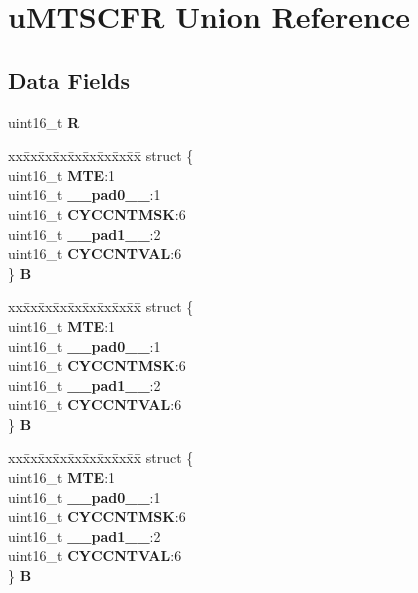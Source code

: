 \hypertarget{unionuMTSCFR}{}\section{u\+M\+T\+S\+C\+FR Union Reference}
\label{unionuMTSCFR}
\subsection*{Data Fields}
\begin{DoxyCompactItemize}
\item 
\mbox{\label{unionuMTSCFR_a91bd2a95fbd0caadf6da5d67d6e1c7c2}} 
uint16\+\_\+t {\bfseries R}
\item 
\mbox{\label{unionuMTSCFR_a1bd8fc26c8d23e866842e9b0d75cba0e}} 
\begin{tabbing}
xx\=xx\=xx\=xx\=xx\=xx\=xx\=xx\=xx\=\kill
struct \{\\
\>uint16\_t {\bfseries MTE}:1\\
\>uint16\_t {\bfseries \_\_pad0\_\_}:1\\
\>uint16\_t {\bfseries CYCCNTMSK}:6\\
\>uint16\_t {\bfseries \_\_pad1\_\_}:2\\
\>uint16\_t {\bfseries CYCCNTVAL}:6\\
\} {\bfseries B}\\

\end{tabbing}\item 
\mbox{\label{unionuMTSCFR_a9b4f2793509a2f5b5ab63f3c9ab1b5a8}} 
\begin{tabbing}
xx\=xx\=xx\=xx\=xx\=xx\=xx\=xx\=xx\=\kill
struct \{\\
\>uint16\_t {\bfseries MTE}:1\\
\>uint16\_t {\bfseries \_\_pad0\_\_}:1\\
\>uint16\_t {\bfseries CYCCNTMSK}:6\\
\>uint16\_t {\bfseries \_\_pad1\_\_}:2\\
\>uint16\_t {\bfseries CYCCNTVAL}:6\\
\} {\bfseries B}\\

\end{tabbing}\item 
\mbox{\label{unionuMTSCFR_ae1cb25b73f8f8137eda808370af22e5d}} 
\begin{tabbing}
xx\=xx\=xx\=xx\=xx\=xx\=xx\=xx\=xx\=\kill
struct \{\\
\>uint16\_t {\bfseries MTE}:1\\
\>uint16\_t {\bfseries \_\_pad0\_\_}:1\\
\>uint16\_t {\bfseries CYCCNTMSK}:6\\
\>uint16\_t {\bfseries \_\_pad1\_\_}:2\\
\>uint16\_t {\bfseries CYCCNTVAL}:6\\
\} {\bfseries B}\\


\end{tabbing}
\end{DoxyCompactItemize}
